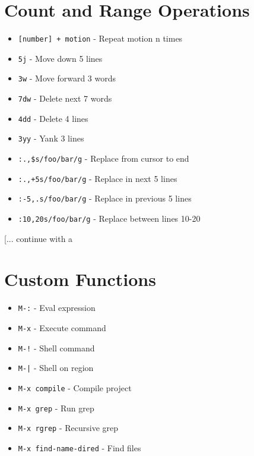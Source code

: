 \documentclass[6pt,landscape]{article}
\newcommand{\key}[1]{\texttt{#1}}
\begin{document}
\begin{multicols*}{5}
\section*{Count and Range Operations}
\begin{itemize}[leftmargin=*,itemsep=0pt,parsep=0pt,topsep=0pt]
\item \key{[number] + motion} - Repeat motion n times
\item \key{5j} - Move down 5 lines
\item \key{3w} - Move forward 3 words
\item \key{7dw} - Delete next 7 words
\item \key{4dd} - Delete 4 lines
\item \key{3yy} - Yank 3 lines
\item \key{:.,\$s/foo/bar/g} - Replace from cursor to end
\item \key{:.,+5s/foo/bar/g} - Replace in next 5 lines
\item \key{:-5,.s/foo/bar/g} - Replace in previous 5 lines
\item \key{:10,20s/foo/bar/g} - Replace between lines 10-20
\end{itemize}

[... continue with a\section*{Custom Functions}
\begin{itemize}[leftmargin=*,itemsep=0pt,parsep=0pt,topsep=0pt]
\item \key{M-:} - Eval expression
\item \key{M-x} - Execute command
\item \key{M-!} - Shell command
\item \key{M-|} - Shell on region
\item \key{M-x compile} - Compile project
\item \key{M-x grep} - Run grep
\item \key{M-x rgrep} - Recursive grep
\item \key{M-x find-name-dired} - Find files
\end{itemize}


\end{multicols*}
\end{document}
